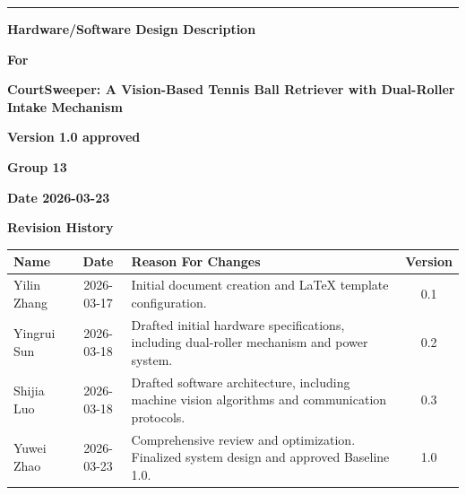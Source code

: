 \documentclass[12pt,a4paper]{article}
\begin{document}
\begin{titlepage}
\raggedleft
\rule{\linewidth}{3pt}

\vspace{1.5cm}

{\LARGE\bfseries Hardware/Software Design Description\par}

\vspace{1.5cm}

{\Large\bfseries For\par}

\vspace{1.5cm}

{\Huge\bfseries CourtSweeper: A Vision-Based Tennis Ball Retriever with Dual-Roller Intake Mechanism \par}

\vspace{1.5cm}

{\bfseries Version 1.0 approved} \\ [0.8cm]

\vspace{1.5cm}

{\bfseries Group 13} \\ [0.8cm]

\vspace{1.5cm}

{\bfseries Date 2026-03-23} \\ [3cm]
\end{titlepage}

\thispagestyle{nofooter}

\begin{center}
  \Large\bfseries
  Revision History
\end{center}

\begin{tabularx}{0.9\textwidth}{|X|c|X|c|}
  \hline
  \rowcolor[RGB]{180,180,180}
  \textbf{Name} & \textbf{Date} & \textbf{Reason For Changes} & \textbf{Version} \\ \hline

  Yilin Zhang & 2026-03-17 & Initial document creation and LaTeX template configuration. & 0.1 \\ \hline
  Yingrui Sun & 2026-03-18 & Drafted initial hardware specifications, including dual-roller mechanism and power system. & 0.2 \\ \hline
  Shijia Luo & 2026-03-18 & Drafted software architecture, including machine vision algorithms and communication protocols. & 0.3 \\ \hline
  Yuwei Zhao & 2026-03-23 & Comprehensive review and optimization. Finalized system design and approved Baseline 1.0. & 1.0 \\ \hline
\end{tabularx}
\end{document}
